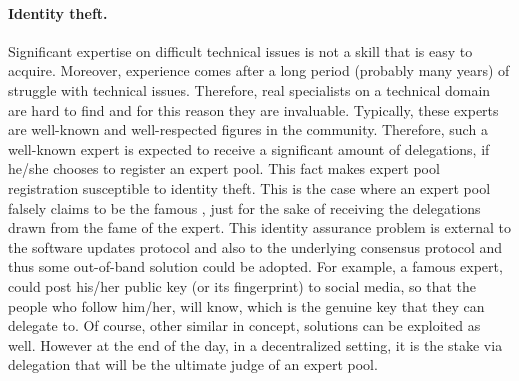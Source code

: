 \paragraph{Identity theft.}
Significant expertise on difficult technical issues is not a skill that is easy to acquire. Moreover, experience comes after a long period (probably many years) of struggle with technical issues. Therefore, real specialists on a technical domain are hard to find and for this reason they are invaluable. Typically, these experts are well-known and well-respected figures in the community. Therefore, such a well-known expert is expected to receive a significant amount of delegations, if he/she chooses to register an expert pool. This fact makes expert pool registration susceptible to identity theft. This is the case where an expert pool falsely claims to be the famous , just for the sake of receiving the delegations drawn from the fame of the expert. This identity assurance problem is external to the software updates protocol and also to the underlying consensus protocol and thus some out-of-band solution could be adopted. For example, a famous expert, could post his/her public key (or its fingerprint) to social media, so that the people who follow him/her, will know, which is the genuine key that they can delegate to. Of course, other similar in concept, solutions can be exploited as well. However at the end of the day, in a decentralized setting, it is the stake via delegation that will be the ultimate judge of an expert pool.


